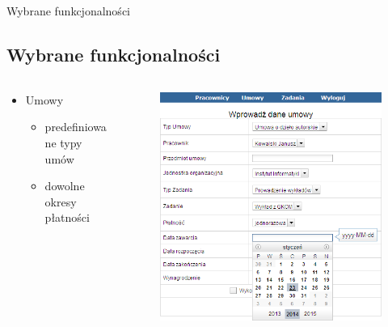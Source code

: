 \documentclass[10pt,utf8]{beamer}
\begin{document}
\begin{frame}{Wybrane funkcjonalności}	
	\subsection{Wybrane funkcjonalności}	
\begin{columns}
\begin{column}{5cm}
	\begin{itemize}
		\item Umowy
		\begin{itemize}
			\item predefiniowane typy umów
			\item dowolne okresy płatności
		\end{itemize}
	\end{itemize}
\end{column}
\begin{column}{5cm}
\begin{figure}[h]
    \begin{center}
    \includegraphics[angle=0,scale=0.4]{umowaForm.png}
    \end{center}
    
\end{figure}
\end{column}
\end{columns}
\end{frame}
\end{document}

